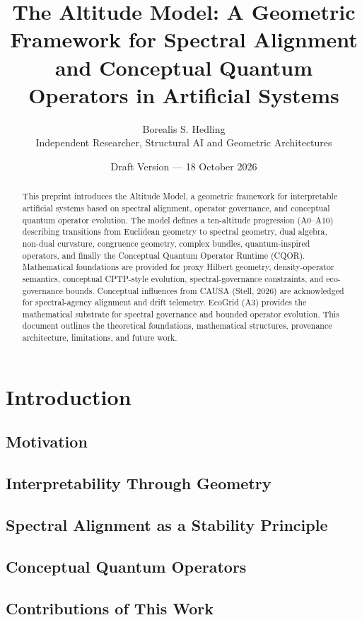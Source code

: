 \documentclass[11pt]{article}
\title{The Altitude Model: A Geometric Framework for Spectral Alignment and 
Conceptual Quantum Operators in Artificial Systems}
\author{
Borealis S. Hedling \\
Independent Researcher, Structural AI and Geometric Architectures
}
\date{Draft Version — 18 October 2026}
\begin{document}
\maketitle

\begin{abstract}
This preprint introduces the Altitude Model, a geometric framework for 
interpretable artificial systems based on spectral alignment, operator 
governance, and conceptual quantum operator evolution. The model defines 
a ten-altitude progression (A0--A10) describing transitions from Euclidean 
geometry to spectral geometry, dual algebra, non-dual curvature, congruence 
geometry, complex bundles, quantum-inspired operators, and finally the 
Conceptual Quantum Operator Runtime (CQOR). Mathematical foundations are 
provided for proxy Hilbert geometry, density-operator semantics, conceptual 
CPTP-style evolution, spectral-governance constraints, and eco-governance 
bounds. Conceptual influences from CAUSA (Stell, 2026) are acknowledged 
for spectral-agency alignment and drift telemetry. EcoGrid (A3) provides 
the mathematical substrate for spectral governance and bounded operator 
evolution. This document outlines the theoretical foundations, mathematical 
structures, provenance architecture, limitations, and future work.
\end{abstract}

\tableofcontents

\section{Introduction}
\subsection{Motivation}
\subsection{Interpretability Through Geometry}
\subsection{Spectral Alignment as a Stability Principle}
\subsection{Conceptual Quantum Operators}
\subsection{Contributions of This Work}
\end{document}

